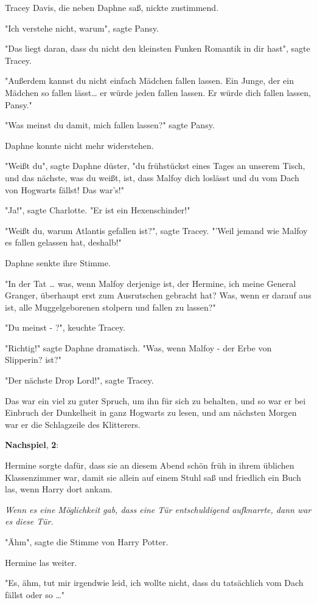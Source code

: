 {Tracey Davis, die neben Daphne saß, nickte zustimmend.

"Ich verstehe nicht, warum", sagte Pansy.

"Das liegt daran, dass du nicht den kleinsten Funken Romantik in dir hast", sagte Tracey.

"Außerdem kannst du nicht einfach Mädchen fallen lassen. Ein Junge, der ein Mädchen so fallen lässt… er würde jeden fallen lassen. Er würde dich fallen lassen, Pansy."

"Was meinst du damit, mich fallen lassen?" sagte Pansy.

Daphne konnte nicht mehr widerstehen.

"Weißt du", sagte Daphne düster, "du frühstückst eines Tages an unserem Tisch, und das nächste, was du weißt, ist, dass Malfoy dich loslässt und du vom Dach von Hogwarts fällst! Das war's!"

"Ja!", sagte Charlotte. "Er ist ein Hexenschinder!"

"Weißt du, warum Atlantis gefallen ist?", sagte Tracey. "'Weil jemand wie Malfoy es fallen gelassen hat, deshalb!"

Daphne senkte ihre Stimme.

"In der Tat … was, wenn Malfoy derjenige ist, der Hermine, ich meine General Granger, überhaupt erst zum Ausrutschen gebracht hat? Was, wenn er darauf aus ist, alle Muggelgeborenen stolpern und fallen zu lassen?"

"Du meinst - ?", keuchte Tracey.

"Richtig!" sagte Daphne dramatisch. "Was, wenn Malfoy - der Erbe von Slipperin? ist?"

"Der nächste Drop Lord!", sagte Tracey.

Das war ein viel zu guter Spruch, um ihn für sich zu behalten, und so war er bei Einbruch der Dunkelheit in ganz Hogwarts zu lesen, und am nächsten Morgen war er die Schlagzeile des Klitterers.

\textbf{Nachspiel}, \textbf{2}:

Hermine sorgte dafür, dass sie an diesem Abend schön früh in ihrem üblichen Klassenzimmer war, damit sie allein auf einem Stuhl saß und friedlich ein Buch las, wenn Harry dort ankam.

\emph{Wenn es eine Möglichkeit gab, dass eine Tür entschuldigend aufknarrte, dann war es diese Tür.}

"Ähm", sagte die Stimme von Harry Potter.

Hermine las weiter.

"Es, ähm, tut mir irgendwie leid, ich wollte nicht, dass du tatsächlich vom Dach fällst oder so …"

}
